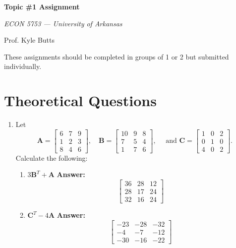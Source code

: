 \documentclass[12pt]{article}
\newcommand{\answer}[1]{{\color{blue_winged_teal}\textbf{Answer:} #1}}
\begin{document}
\begin{center}
  {\Huge\bf Topic \#1 Assignment}
  
  \smallskip
  {\large\it  ECON 5753 — University of Arkansas}

  \medskip
  {\large Prof. Kyle Butts}
\end{center}

These assignments should be completed in groups of 1 or 2 but submitted individually. 

\section*{Theoretical Questions}

\begin{enumerate}
  \item Let 
  $$
    \bm{A} = \begin{bmatrix} 6 & 7 & 9 \\ 1 & 2 & 3 \\ 8 & 4 & 6 \end{bmatrix}, 
    \quad 
    \bm{B} = \begin{bmatrix} 10 & 9 & 8 \\ 7 & 5 & 4 \\ 1 & 7 & 6 \end{bmatrix},
    \quad \text{ and } 
    \bm{C} = \begin{bmatrix} 1 & 0 & 2 \\ 0 & 1 & 0 \\ 4 & 0 & 2 \end{bmatrix}.
  $$ 
  Calculate the following:
  
  \begin{enumerate}
    \item $3\bm{B}^T + \bm{A}$
    \answer{
      $$
        \begin{bmatrix}
          36 & 28 & 12 \\ 
          28 & 17 & 24 \\ 
          32 & 16 & 24 
        \end{bmatrix}
      $$
    }
    
    \item $\bm{C}^T - 4\bm{A}$
    \answer{
      $$
        \begin{bmatrix}
          -23 & -28 & -32 \\ 
          -4 & -7 & -12 \\ 
          -30 & -16 & -22
        \end{bmatrix}
      $$
    }
    

\end{enumerate}
\end{enumerate}
\end{document}

